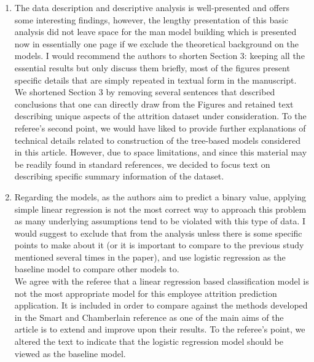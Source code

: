 \documentclass{amsart}[12pt]
\begin{document}
\begin{enumerate}
        \hspace{10pt}
    \item   {\color{blue} 
        The data description and descriptive analysis is well-presented and offers some interesting findings, however, the lengthy presentation of this basic analysis did not leave space for the man model building which is presented now in essentially one page if we exclude the theoretical background on the models. I would recommend the authors to shorten Section 3: keeping all the essential results but only discuss them briefly, most of the figures present specific details that are simply repeated in textual form in the manuscript.
        }\\

        We shortened Section 3 by removing several sentences that described conclusions that one can 
        directly draw from the Figures and retained text describing unique aspects of the attrition 
        dataset under consideration.  To the referee's second point, we would have liked to provide 
        further explanations of technical details related to construction of the tree-based models 
        considered in this article.  However, due to space limitations, and since this material may 
        be readily found in standard references, we decided to focus text on describing specific 
        summary information of the dataset. 
        
        \hspace{10pt}
    \item   {\color{blue} 
        Regarding the models, as the authors aim to predict a binary value, applying simple linear regression is not the most correct way to approach this problem as many underlying assumptions tend to be violated with this type of data. I would suggest to exclude that from the analysis unless there is some specific points to make about it (or it is important to compare to the previous study mentioned several times in the paper), and use logistic regression as the baseline model to compare other models to. 
        }\\

        We agree with the referee that a linear regression based classification model is not the 
        most appropriate model for this employee attrition prediction application. It is included in 
        order to compare against the methods developed in the Smart and Chamberlain reference as one 
        of the main aims of the article is to extend and improve upon their results.  To the referee's 
        point, we altered the text to indicate that the logistic regression model should 
        be viewed as the baseline model.
        

\end{enumerate}
\end{document}
